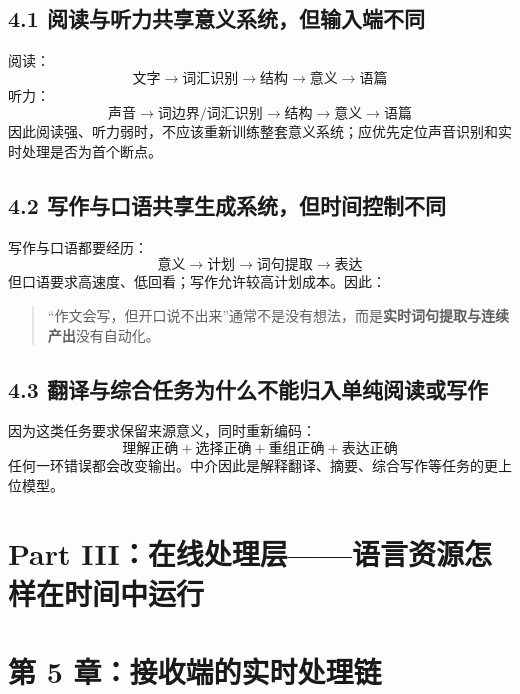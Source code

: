 \documentclass[11pt,a4paper]{ctexart}
\newcommand{\kw}[1]{\textbf{#1}}
\begin{document}
\subsection{4.1 阅读与听力共享意义系统，但输入端不同}
阅读：
\[
\text{文字}\rightarrow\text{词汇识别}\rightarrow\text{结构}\rightarrow\text{意义}\rightarrow\text{语篇}
\]
听力：
\[
\text{声音}\rightarrow\text{词边界/词汇识别}\rightarrow\text{结构}\rightarrow\text{意义}\rightarrow\text{语篇}
\]
因此阅读强、听力弱时，不应该重新训练整套意义系统；应优先定位声音识别和实时处理是否为首个断点。

\subsection{4.2 写作与口语共享生成系统，但时间控制不同}
写作与口语都要经历：
\[
\text{意义}\rightarrow\text{计划}\rightarrow\text{词句提取}\rightarrow\text{表达}
\]
但口语要求高速度、低回看；写作允许较高计划成本。因此：
\begin{quote}
“作文会写，但开口说不出来”通常不是没有想法，而是\kw{实时词句提取与连续产出}没有自动化。
\end{quote}

\subsection{4.3 翻译与综合任务为什么不能归入单纯阅读或写作}
因为这类任务要求保留来源意义，同时重新编码：
\[
\boxed{\text{理解正确} + \text{选择正确} + \text{重组正确} + \text{表达正确}}
\]
任何一环错误都会改变输出。中介因此是解释翻译、摘要、综合写作等任务的更上位模型。

\newpage
\section{Part III：在线处理层——语言资源怎样在时间中运行}

\section{第 5 章：接收端的实时处理链}
\end{document}
